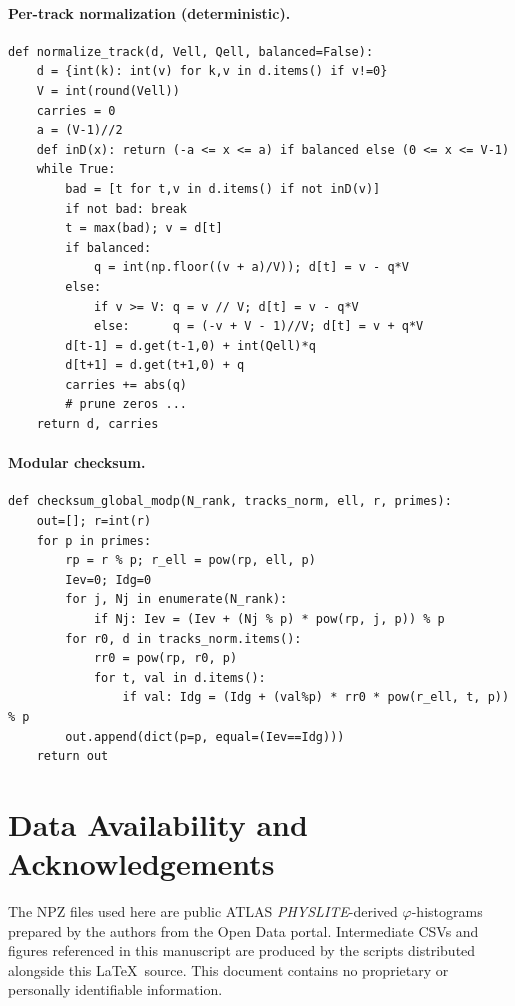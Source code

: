 \documentclass[11pt]{article}
\begin{document}
\paragraph{Per-track normalization (deterministic).}
\begin{verbatim}
def normalize_track(d, Vell, Qell, balanced=False):
    d = {int(k): int(v) for k,v in d.items() if v!=0}
    V = int(round(Vell))
    carries = 0
    a = (V-1)//2
    def inD(x): return (-a <= x <= a) if balanced else (0 <= x <= V-1)
    while True:
        bad = [t for t,v in d.items() if not inD(v)]
        if not bad: break
        t = max(bad); v = d[t]
        if balanced:
            q = int(np.floor((v + a)/V)); d[t] = v - q*V
        else:
            if v >= V: q = v // V; d[t] = v - q*V
            else:      q = (-v + V - 1)//V; d[t] = v + q*V
        d[t-1] = d.get(t-1,0) + int(Qell)*q
        d[t+1] = d.get(t+1,0) + q
        carries += abs(q)
        # prune zeros ...
    return d, carries
\end{verbatim}

\paragraph{Modular checksum.}
\begin{verbatim}
def checksum_global_modp(N_rank, tracks_norm, ell, r, primes):
    out=[]; r=int(r)
    for p in primes:
        rp = r % p; r_ell = pow(rp, ell, p)
        Iev=0; Idg=0
        for j, Nj in enumerate(N_rank):
            if Nj: Iev = (Iev + (Nj % p) * pow(rp, j, p)) % p
        for r0, d in tracks_norm.items():
            rr0 = pow(rp, r0, p)
            for t, val in d.items():
                if val: Idg = (Idg + (val%p) * rr0 * pow(r_ell, t, p)) % p
        out.append(dict(p=p, equal=(Iev==Idg)))
    return out
\end{verbatim}

\section*{Data Availability and Acknowledgements}
The NPZ files used here are public ATLAS \emph{PHYSLITE}-derived $\varphi$-histograms prepared by
the authors from the Open Data portal. Intermediate CSVs and figures referenced in this manuscript
are produced by the scripts distributed alongside this \LaTeX\ source. This document contains no
proprietary or personally identifiable information.
\end{document}

